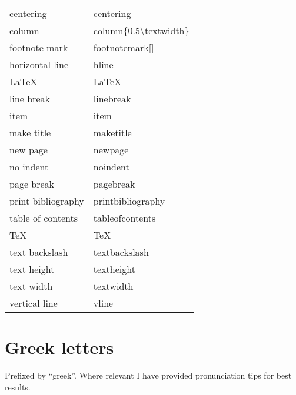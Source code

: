 \documentclass[12pt, a4paper]{article}
\begin{document}
\begin{longtable}{ll}
centering & centering \\
column & column\{0.5\textbackslash textwidth\} \\
footnote mark & footnotemark[] \\
horizontal line & hline \\
LaTeX & \LaTeX~  \\
line break & linebreak \\
item & item \\
make title & maketitle \\
new page & newpage \\
no indent & noindent \\
page break & pagebreak \\
print bibliography & printbibliography \\
table of contents & tableofcontents \\
TeX & \TeX~  \\
text backslash & textbackslash \\
text height & textheight \\
text width & textwidth \\
vertical line & vline \\
\end{longtable}

\section{Greek letters}
Prefixed by ``greek''. Where relevant I have provided pronunciation tips for best results.
\end{document}
